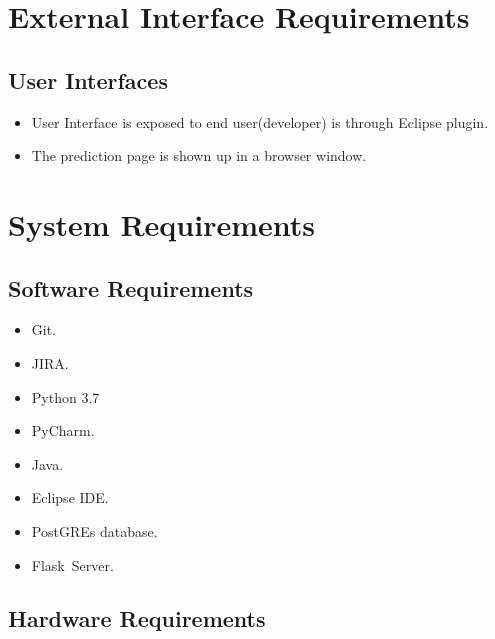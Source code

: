 \documentclass[oneside,a4paper,12pt]{book}
\begin{document}
\newpage 
\section{External Interface Requirements}

\subsection{User Interfaces}
\begin{itemize}
    \item User Interface is exposed to end user(developer) is through Eclipse plugin.\par
    \item The prediction page is shown up in a browser window.
\end{itemize}

\section{System Requirements}
\subsection{Software Requirements}
\setlength{\parskip}{0.0pt}
\begin{itemize}
	\item Git.\par

	\item JIRA.\par

	\item Python 3.7\par

	\item PyCharm.\par

	\item Java.\par

	\item Eclipse IDE.\par

	\item PostGREs database.\par

	\item Flask\  Server.
\end{itemize}\par


\subsection{Hardware Requirements}
\end{document}
